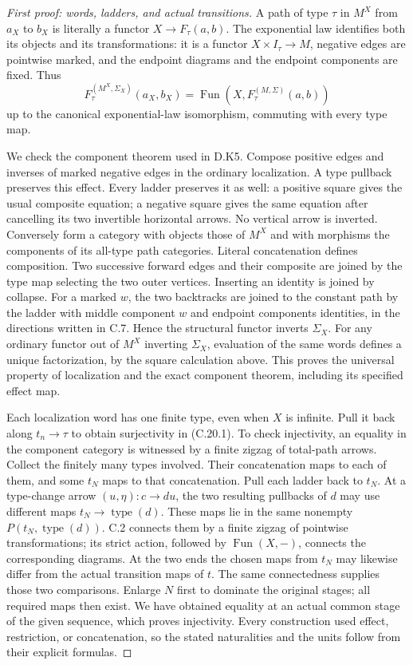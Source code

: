 \begin{proof}[First proof: words, ladders, and actual transitions]
A path of type $\tau$ in $M^X$ from $a_X$ to $b_X$ is literally a
functor $X\to F_\tau(a,b)$. The exponential law identifies both
its objects and its transformations: it is a functor
$X\times I_\tau\to M$, negative edges are pointwise marked,
and the endpoint diagrams and the endpoint components are fixed.
Thus
\[
 F_\tau^{(M^X,\Sigma_X)}(a_X,b_X)
       =\operatorname{Fun}(X,F_\tau^{(M,\Sigma)}(a,b))       \tag{C.20.2}
\]
up to the canonical exponential-law isomorphism, commuting with
every type map.

We check the component theorem used in D.K5. Compose positive
edges and inverses of marked negative edges in the ordinary
localization. A type pullback preserves this effect. Every ladder
preserves it as well: a positive square gives the usual composite
equation; a negative square gives the same equation after
cancelling its two invertible horizontal arrows. No vertical arrow
is inverted. Conversely form a category with objects those of $M^X$
and with morphisms the components of its all-type path categories.
Literal concatenation defines composition. Two successive forward
edges and their composite are joined by the type map selecting the
two outer vertices. Inserting an identity is joined by collapse.
For a marked $w$, the two backtracks are joined to the constant
path by the ladder with middle component $w$ and endpoint
components identities, in the directions written in C.7. Hence
the structural functor inverts $\Sigma_X$. For any ordinary functor
out of $M^X$ inverting $\Sigma_X$, evaluation of the same words
defines a unique factorization, by the square calculation above.
This proves the universal property of localization and the exact
component theorem, including its specified effect map.

Each localization word has one finite type, even when $X$ is
infinite. Pull it back along $t_n\to\tau$ to obtain surjectivity
in (C.20.1). To check injectivity, an equality in the component
category is witnessed by a finite zigzag of total-path arrows.
Collect the finitely many types involved. Their concatenation maps
to each of them, and some $t_N$ maps to that concatenation. Pull
each ladder back to $t_N$. At a type-change arrow
$(u,\eta):c\to d u$, the two resulting pullbacks of $d$ may use
different maps $t_N\to\operatorname{type}(d)$. These maps lie in
the same nonempty $P(t_N,\operatorname{type}(d))$. C.2 connects
them by a finite zigzag of pointwise transformations; its strict
action, followed by $\operatorname{Fun}(X,-)$, connects the
corresponding diagrams. At the two ends the chosen maps from
$t_N$ may likewise differ from the actual transition maps of $t$.
The same connectedness supplies those two comparisons. Enlarge
$N$ first to dominate the original stages; all required maps then
exist. We have obtained equality at an actual common stage of the
given sequence, which proves injectivity. Every construction used
effect, restriction, or concatenation, so the stated naturalities
and the units follow from their explicit formulas.
\end{proof}

